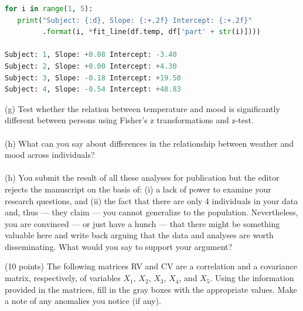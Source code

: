 \documentclass[onecolumn,10pt]{jhwhw}
\begin{document}
\begin{lstlisting}[language=Python]
for i in range(1, 5):
   print("Subject: {:d}, Slope: {:+.2f} Intercept: {:+.2f}"
         .format(i, *fit_line(df.temp, df['part' + str(i)])))

Subject: 1, Slope: +0.08 Intercept: -3.40
Subject: 2, Slope: +0.00 Intercept: +4.30
Subject: 3, Slope: -0.18 Intercept: +19.50
Subject: 4, Slope: -0.54 Intercept: +48.83
\end{lstlisting}
(g) Test whether the relation between temperature and mood is significantly different between persons using Fisher's z transformations and z-test.\\
\\
(h) What can you say about differences in the relationship between weather and mood across individuals?\\
\\
(h) You submit the result of all these analyses for publication but the editor rejects the manuscript on the basis of: (i) a lack of power to examine your research questions, and (ii) the fact that there are only 4 individuals in your data and, thus --- they claim --- you cannot generalize to the population. Nevertheless, you are convinced --- or just have a hunch --- that there might be something valuable here and write back arguing that the data and analyses are worth disseminating. What would you say to support your argument?

\clearpage
\problem{}
(10 points) The following matrices RV and CV are a correlation and a covariance matrix, respectively, of variables $X_1$, $X_2$, $X_3$, $X_4$, and $X_5$. Using the information provided in the matrices, fill in the gray boxes with the appropriate values. Make a note of any anomalies you notice (if any).
\end{document}
